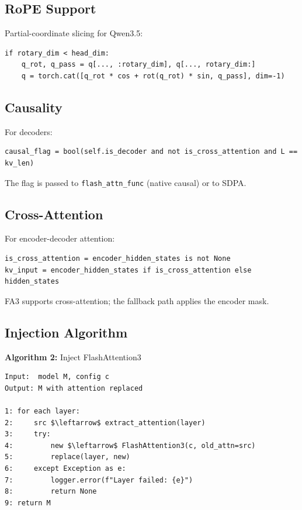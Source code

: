 \subsection{RoPE Support}

Partial-coordinate slicing for Qwen3.5:

\begin{lstlisting}
if rotary_dim < head_dim:
    q_rot, q_pass = q[..., :rotary_dim], q[..., rotary_dim:]
    q = torch.cat([q_rot * cos + rot(q_rot) * sin, q_pass], dim=-1)
\end{lstlisting}

\subsection{Causality}

For decoders:

\begin{lstlisting}
causal_flag = bool(self.is_decoder and not is_cross_attention and L == kv_len)
\end{lstlisting}

The flag is passed to \texttt{flash\_attn\_func} (native causal) or to SDPA.

\subsection{Cross-Attention}

For encoder-decoder attention:

\begin{lstlisting}
is_cross_attention = encoder_hidden_states is not None
kv_input = encoder_hidden_states if is_cross_attention else hidden_states
\end{lstlisting}

FA3 supports cross-attention; the fallback path applies the encoder mask.

\subsection{Injection Algorithm}

\textbf{Algorithm 2:} Inject FlashAttention3
\begin{lstlisting}
Input:  model M, config c
Output: M with attention replaced

1: for each layer:
2:     src $\leftarrow$ extract_attention(layer)
3:     try:
4:         new $\leftarrow$ FlashAttention3(c, old_attn=src)
5:         replace(layer, new)
6:     except Exception as e:
7:         logger.error(f"Layer failed: {e}")
8:         return None
9: return M
\end{lstlisting}

